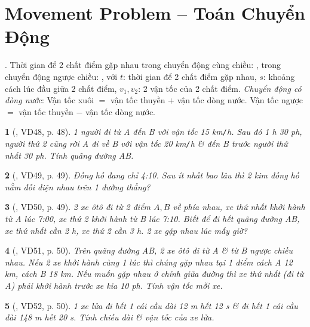 \documentclass{article}
\newtheorem{baitoan}{}
\begin{document}

\section{Movement Problem -- Toán Chuyển Động}
 .  Thời gian để 2 chất điểm gặp nhau trong chuyển động cùng chiều: , trong chuyển động ngược chiều: , với $t$: thời gian để 2 chất điểm gặp nhau, $s$: khoảng cách lúc đầu giữa 2 chất điểm, $v_1,v_2$: 2 vận tốc của 2 chất điểm.  \textit{Chuyển động có dòng nước}: Vận tốc xuôi $=$ vận tốc thuyền $+$ vận tốc dòng nước. Vận tốc ngược $=$ vận tốc thuyền $-$ vận tốc dòng nước.

\begin{baitoan}[\cite{Binh_Toan_6_tap_2}, VD48, p. 48]
	1 người đi từ A đến B với vận tốc {\rm15 km{\tt/}h}. Sau đó {\rm1 h 30 ph}, người thứ 2 cũng rời A đi về B với vận tốc {\rm20 km{\tt/}h} \& đến B trước người thứ nhất {\rm30 ph}. Tính quãng đường AB.
\end{baitoan}

\begin{baitoan}[\cite{Binh_Toan_6_tap_2}, VD49, p. 49]
	Đồng hồ đang chỉ {\rm4:10}. Sau ít nhất bao lâu thì 2 kim đồng hồ nằm đối diện nhau trên 1 đường thẳng?
\end{baitoan}

\begin{baitoan}[\cite{Binh_Toan_6_tap_2}, VD50, p. 49]
	2 xe ôtô đi từ 2 điểm $A,B$ về phía nhau, xe thứ nhất khởi hành từ A lúc {\rm7:00}, xe thứ 2 khởi hành từ B lúc {\rm7:10}. Biết để đi hết quãng đường AB, xe thứ nhất cần {\rm2 h}, xe thứ 2 cần {\rm3 h}. 2 xe gặp nhau lúc mấy giờ?
\end{baitoan}

\begin{baitoan}[\cite{Binh_Toan_6_tap_2}, VD51, p. 50]
	Trên quãng đường AB, 2 xe ôtô đi từ A \& từ B ngược chiều nhau. Nếu 2 xe khởi hành cùng 1 lúc thì chúng gặp nhau tại 1 điểm cách A {\rm12 km}, cách B {\rm18 km}. Nếu muốn gặp nhau ở chính giữa đường thì xe thứ nhất (đi từ A) phải khởi hành trước xe kia {\rm10 ph}. Tính vận tốc mỗi xe.
\end{baitoan}

\begin{baitoan}[\cite{Binh_Toan_6_tap_2}, VD52, p. 50]
	1 xe lửa đi hết 1 cái cầu dài {\rm12 m} hết {\rm12 s} \& đi hết 1 cái cầu dài {\rm148 m} hết {\rm20 s}. Tính chiều dài \& vận tốc của xe lửa.
\end{baitoan}
\end{document}
